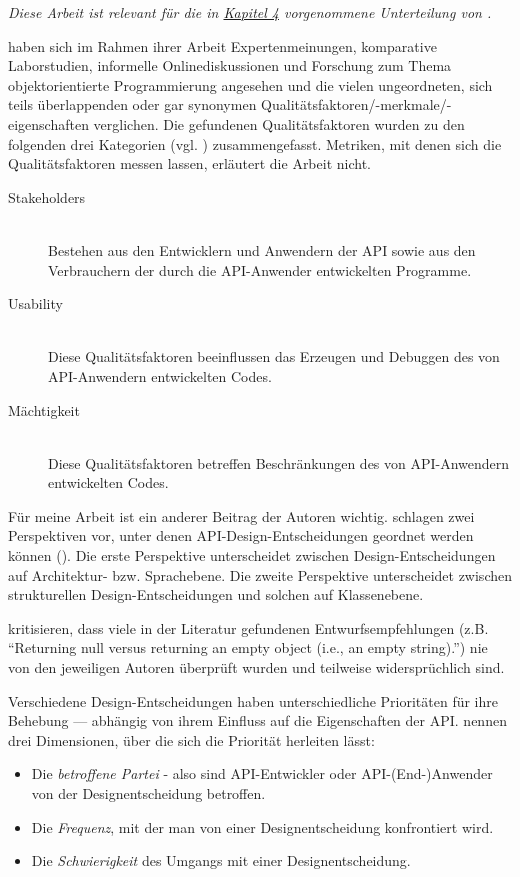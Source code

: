 \begin{important}
\textit{Diese Arbeit ist relevant für die in \href{sec:Ergebnisse}{Kapitel 4} vorgenommene Unterteilung von .}

\cite{Stylos:2007ip} haben sich im Rahmen ihrer Arbeit Expertenmeinungen, komparative Laborstudien, informelle Onlinediskussionen und Forschung zum Thema objektorientierte Programmierung angesehen und die vielen ungeordneten, sich teils überlappenden oder gar synonymen Qualitätsfaktoren/-merkmale/-eigenschaften verglichen. Die gefundenen Qualitätsfaktoren wurden zu den folgenden drei Kategorien (vgl. ) zusammengefasst. Metriken, mit denen sich die Qualitätsfaktoren messen lassen, erläutert die Arbeit nicht.
\begin{description}
  \item[Stakeholders] \hfill \\
  Bestehen aus den Entwicklern und Anwendern der API sowie aus den Verbrauchern der durch die API-Anwender entwickelten Programme.
  \item[Usability] \hfill \\
  Diese Qualitätsfaktoren beeinflussen das Erzeugen und Debuggen des von API-Anwendern entwickelten Codes.
  \item[Mächtigkeit] \hfill \\
  Diese Qualitätsfaktoren betreffen Beschränkungen des von API-Anwendern entwickelten Codes.
\end{description}

Für meine Arbeit ist ein anderer Beitrag der Autoren wichtig. \cite{Stylos:2007ip} schlagen zwei Perspektiven vor, unter denen API-Design-Entscheidungen geordnet werden können (). Die erste Perspektive unterscheidet zwischen Design-Entscheidungen auf Architektur- bzw. Sprachebene. Die zweite Perspektive unterscheidet zwischen strukturellen Design-Entscheidungen und solchen auf Klassenebene. 

\cite{Stylos:2006td,Stylos:2007ip} kritisieren, dass viele in der Literatur gefundenen Entwurfsempfehlungen (z.B. ``Returning null versus returning an empty object
(i.e., an empty string).'') nie von den jeweiligen Autoren überprüft wurden und teilweise widersprüchlich sind.

Verschiedene Design-Entscheidungen haben unterschiedliche Prioritäten für ihre Behebung --- abhängig von ihrem Einfluss auf die Eigenschaften der API. \cite{Stylos:2006td} nennen drei Dimensionen, über die sich die Priorität herleiten lässt:
\begin{itemize}
\item Die \emph{betroffene Partei} - also sind API-Entwickler oder API-(End-)Anwender von der Designentscheidung betroffen.
\item Die \emph{Frequenz}, mit der man von einer Designentscheidung konfrontiert wird.
\item Die \emph{Schwierigkeit} des Umgangs mit einer Designentscheidung.
\end{itemize}


\end{important}
